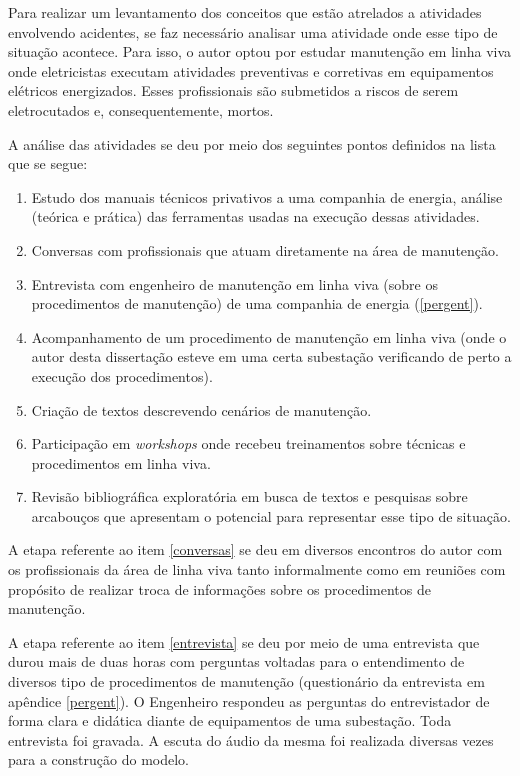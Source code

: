 Para realizar um levantamento dos conceitos que estão atrelados a atividades envolvendo acidentes, se faz necessário analisar uma atividade onde esse tipo de situação acontece. Para isso, o autor optou por estudar manutenção em linha viva onde eletricistas executam atividades preventivas e corretivas em equipamentos elétricos energizados. Esses profissionais são submetidos a riscos de serem eletrocutados e, consequentemente, mortos. 

A análise das atividades se deu por meio dos seguintes pontos definidos na lista que se segue: 
\begin{enumerate}
	\item Estudo dos manuais técnicos privativos a uma companhia de energia, análise (teórica e prática) das ferramentas usadas na execução dessas atividades. \label{estudosprivativos}
	\item Conversas com profissionais que atuam diretamente na área de manutenção. \label{conversas}
	\item Entrevista com engenheiro de manutenção em linha viva (sobre os procedimentos de manutenção) de uma companhia de energia (\ref{pergent}). \label{entrevista}
	\item Acompanhamento de um procedimento de manutenção em linha viva (onde o autor desta dissertação esteve em uma certa subestação verificando de perto a execução dos procedimentos). \label{inloco}
	\item Criação de textos descrevendo cenários de manutenção.
	\item Participação em \textit{workshops} onde recebeu treinamentos sobre técnicas e procedimentos em linha viva.
	\item Revisão bibliográfica exploratória em busca de textos e pesquisas sobre arcabouços que apresentam o potencial para representar esse tipo de situação. \label{revisaoexploratoria}
\end{enumerate}

A etapa referente ao item \ref{conversas} se deu em diversos encontros do autor com os profissionais da área de linha viva tanto informalmente como em reuniões com propósito de realizar troca de informações sobre os procedimentos de manutenção. 

A etapa referente ao item \ref{entrevista} se deu por meio de uma entrevista que durou mais de duas horas com perguntas voltadas para o entendimento de diversos tipo de procedimentos de manutenção (questionário da entrevista em apêndice \ref{pergent}). O Engenheiro respondeu as perguntas do entrevistador de forma clara e didática diante de equipamentos de uma subestação. Toda entrevista foi gravada. A escuta do áudio da mesma foi realizada diversas vezes para a construção do modelo.  

